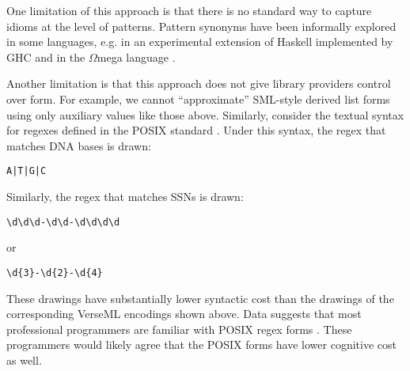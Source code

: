 One limitation of this approach is that there is no standard way to capture idioms at the level of patterns. Pattern synonyms have been informally explored in some languages, e.g. in an experimental extension of Haskell implemented by GHC \cite{GHC-extensions} and in the $\Omega$mega language \cite{DBLP:conf/cefp/SheardL07}.

Another limitation is that this approach does not give library providers control over form. For example, we cannot ``approximate'' SML-style derived list forms using only auxiliary values like those above.  
Similarly, consider the textual syntax for regexes defined in the POSIX standard \cite{STD95954}. Under this syntax, the regex that matches DNA bases is drawn:
\begin{lstlisting}[numbers=none]
A|T|G|C
\end{lstlisting}
Similarly, the regex that matches SSNs is drawn:
\begin{lstlisting}[numbers=none]
\d\d\d-\d\d-\d\d\d\d
\end{lstlisting}
or
\begin{lstlisting}[numbers=none]
\d{3}-\d{2}-\d{4}
\end{lstlisting}
These drawings have substantially lower syntactic cost than the drawings of the corresponding VerseML encodings shown above. Data suggests that most professional programmers are familiar with POSIX regex forms \cite{Omar:2012:ACC:2337223.2337324}. These programmers would likely agree that the POSIX forms have lower cognitive cost as well. 

\vspace{-6px}
